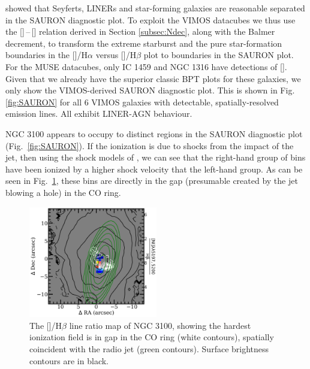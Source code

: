 		\citet{Sarzi2010} showed that Seyferts, LINERs and star-forming galaxies are reasonable separated in the SAURON diagnostic plot. To exploit the VIMOS datacubes we thus use the []\,--\,[] relation derived in Section \ref{subsec:Ndec}, along with the Balmer decrement, to transform the \citet{Kewley2001} extreme starburst and the \citet{Kauffmann2003a} pure star-formation boundaries in the []/H$\alpha$ versus []/H$\beta$ plot to boundaries in the SAURON plot. For the MUSE datacubes, only IC 1459 and NGC 1316 have detections of []. Given that we already have the superior classic BPT plots for these galaxies, we only show the VIMOS-derived SAURON diagnostic plot. This is shown in Fig.\,\ref{fig:SAURON} for all 6 VIMOS galaxies with detectable, spatially-resolved emission lines. All exhibit LINER-AGN behaviour.

		NGC 3100 appears to occupy to distinct regions in the SAURON diagnostic plot (Fig.\ \ref{fig:SAURON}). If the ionization is due to shocks from the impact of the jet, then using the shock models of \citet{Allen2008}, we can see that the right-hand group of bins have been ionized by a higher shock velocity that the left-hand group. As can be seen in Fig.\ \ref{fig:ngc3100_NI_Hb}, these bins are directly in the gap (presumable created by the jet blowing a hole) in the CO ring.

		\begin{figure}
			\centering
			\includegraphics[width=0.5\textwidth]{chapter5/vimos/ngc3100_NI_Hb.png}
			\caption[NGC 3100 /H$\beta$ line ratio map]{The []/H$\beta$ line ratio map of NGC 3100, showing the hardest ionization field is in gap in the CO ring (white contours), spatially coincident with the radio jet (green contours). Surface brightness contours are in black.}
			\label{fig:ngc3100_NI_Hb}
		\end{figure}
 
